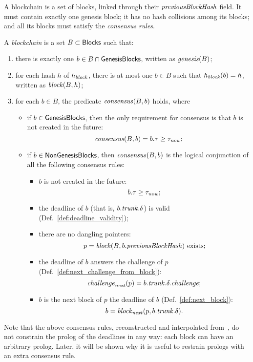 A blockchain is a set of blocks, linked through their ${\mathit{previousBlockHash}}$ field.
It must contain exactly one genesis block; it has no hash collisions among its blocks;
and all its blocks must satisfy the \emph{consensus rules}.
%
\begin{definition}\label{def:blockchain}
  A \emph{blockchain} is a set $B\subset{\mathsf{Blocks}}$ such that:
  \begin{enumerate}
  \item there is exactly one $b\in B\cap{\mathsf{GenesisBlocks}}$, written as ${\mathit{genesis}}(B)$;
  \item for each hash $h$ of $h_{\mathit{block}}$, there is at most
    one $b\in B$ such that $h_{\mathit{block}}(b)=h$, written as ${\mathit{block}}(B,h)$;
  \item for each $b\in B$, the predicate ${\mathit{consensus}}(B,b)$ holds, where
    \begin{itemize}
    \item if $b\in{\mathsf{GenesisBlocks}}$, then the only requirement for consensus is that
      $b$ is not created in the future:
      \[
      {\mathit{consensus}}(B,b)=b.\tau\ge\tau_{\mathit{now}};
      \]
    \item if $b\in{\mathsf{NonGenesisBlocks}}$, then ${\mathit{consensus}}(B,b)$ is the logical conjunction
      of all the following consensus rules:
      \begin{itemize}
      \item $b$ is not created in the future:
        \[
        b.\tau\ge\tau_{\mathit{now}};
        \]
      \item the deadline of $b$ (that is, $b.{\mathit{trunk}}.\delta$) is valid (Def.~\ref{def:deadline_validity});
      \item there are no dangling pointers:
        \[
        p={\mathit{block}}(B,b.{\mathit{previousBlockHash}})\text{ exists;}
        \]
      \item the deadline of $b$ answers the challenge of $p$ (Def.~\ref{def:next_challenge_from_block}):
        \[
        {\mathit{challenge}}_{\mathit{next}}(p)=b.{\mathit{trunk}}.\delta.{\mathit{challenge}};
        \]
      \item $b$ is the next block of $p$ \wrt the deadline of $b$ (Def.~\ref{def:next_block}):
        \[
        b={\mathit{block}}_{\mathit{next}}(p,b.{\mathit{trunk}}.\delta).
        \]
      \end{itemize}
    \end{itemize}
  \end{enumerate}
\end{definition}
%
Note that the above consensus rules, reconstructed and interpolated
from~\cite{SignumPlotting,SignumSource},
do not constrain the prolog of the deadlines in any way:
each block can have an arbitrary prolog. Later, it will be shown why it is useful to
restrain prologs with an extra consensus rule.


